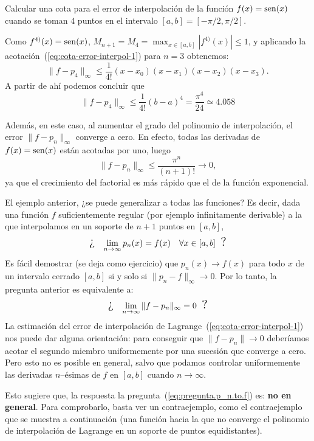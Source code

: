 \begin{example}
  \label{ex:expresion-del-error-interpol}
  Calcular una cota para el error de interpolación de la función
  $f(x)=\operatorname{sen}(x)$ cuando se toman $4$ puntos en el intervalo $[a,b]=[-\pi/2,\pi/2]$.

  Como $f^{4)}(x)=\operatorname{sen}(x)$, $M_{n+1}=M_4=\max_{x\in
    [a,b]}|f^{4)}(x)|\le 1$, y aplicando la
  acotación~(\ref{eq:cota-error-interpol-1}) para $n=3$ obtenemos:
  \begin{equation*}
    \|f-p_4\|_\infty \le \frac{1}{4!}(x-x_0)(x-x_1)(x-x_2)(x-x_3).
  \end{equation*}
  A partir de ahí podemos concluir que
  \begin{equation*}
    \|f-p_4\|_\infty \le \frac{1}{4!}(b-a)^4 = \frac{\pi^4}{24}
    \simeq 4.058
  \end{equation*}

  Además, en este caso, al
  aumentar el grado del polinomio de interpolación, el error
  $\|f-p_n\|_\infty$ converge a cero. En efecto, todas las derivadas
  de $f(x)=\operatorname{sen}(x)$ están acotadas por uno, luego
  \begin{equation*}
    \|f-p_n\|_\infty\le \frac{\pi^n}{(n+1)!} \to 0,
  \end{equation*}
  ya que el crecimiento del factorial es más rápido que el de la
  función exponencial.
\end{example}
\begin{remark}
  El ejemplo anterior, ¿se puede generalizar a todas las funciones? Es decir, dada una
  función $f$ suficientemente regular (por ejemplo infinitamente
  derivable) a la que interpolamos en un soporte de $n+1$ puntos en
  $[a,b]$,
  \begin{equation}
    \text{\Large ¿ \;}
    \lim_{n\to\infty} p_n(x) = f(x) \quad \forall x\in [a,b]
    \text{\; \Large?}
    \label{eq:pregunta.p_n.to.f}
  \end{equation}
  Es fácil demostrar (se deja como ejercicio) que $p_n(x)\to f(x)$
  para todo $x$ de un intervalo cerrado $[a,b]$ si y solo si $\|p_n -
  f\|_\infty\to 0$. Por lo tanto, la pregunta anterior es equivalente
  a:
  \begin{equation*}
    \text{\Large ¿ \;}
    \lim_{n\to\infty} \|f-p_n\|_\infty=0
    \text{\; \Large ?}
  \end{equation*}
  La estimación del error de interpolación de
  Lagrange~(\ref{eq:cota-error-interpol-1}) nos puede dar alguna
  orientación: para conseguir que
  $\|f-p_n\|\to 0$ deberíamos acotar el segundo miembro uniformemente
  por una sucesión que converge a cero. Pero esto  no es posible en
  general, salvo que podamos controlar uniformemente las derivadas
  $n$--ésimas de $f$ en $[a,b]$ cuando $n\to \infty$.

  Esto sugiere que, la respuesta la
  pregunta~(\ref{eq:pregunta.p_n.to.f}) es: \textbf{no en
    general}. Para comprobarlo, basta ver un contraejemplo, como el
  contraejemplo que se muestra a continuación (una función hacia la que no
  converge el polinomio de interpolación de Lagrange en un soporte de
  puntos equidistantes).
\end{remark}

